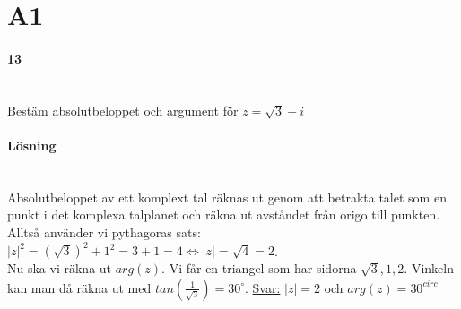 \section*{A1}
\paragraph{13}~\\
Bestäm absolutbeloppet och argument för $z=\sqrt{3}-i$

\paragraph{Lösning}~\\
Absolutbeloppet av ett komplext tal räknas ut genom att betrakta talet
som en punkt i det komplexa talplanet och räkna ut avståndet från origo
till punkten.\\
Alltså använder vi pythagoras sats:
$|z|^2=(\sqrt{3})^2+1^2=3+1=4\Leftrightarrow |z|=\sqrt{4}=2$.\\
Nu ska vi räkna ut $arg(z)$.
Vi får en triangel som har sidorna $\sqrt{3},1,2$.
Vinkeln kan man då räkna ut med $tan(\frac{1}{\sqrt{3}})=30^\circ$.
\underline{Svar:} $|z|=2$ och $arg(z)=30^{circ}$
